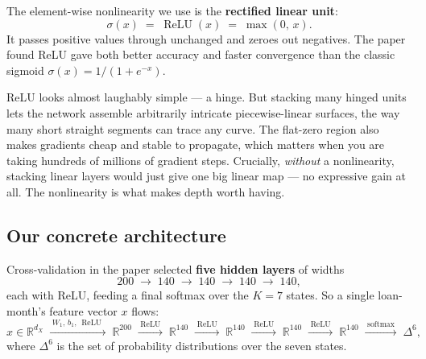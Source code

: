\documentclass[11pt]{article}
\newcommand{\R}{\mathbb{R}}
\newcommand{\softmax}{\operatorname{softmax}}
\newcommand{\relu}{\operatorname{ReLU}}
\begin{document}
The element-wise nonlinearity we use is the \textbf{rectified linear unit}:
\begin{equation}
  \sigma(x) \;=\; \relu(x) \;=\; \max(0,\, x).
  \label{eq:relu}
\end{equation}
It passes positive values through unchanged and zeroes out negatives. The paper found ReLU
gave both better accuracy and faster convergence than the classic sigmoid
$\sigma(x)=1/(1+e^{-x})$.

\begin{intuition}
ReLU looks almost laughably simple --- a hinge. But stacking many hinged units lets the
network assemble arbitrarily intricate piecewise-linear surfaces, the way many short
straight segments can trace any curve. The flat-zero region also makes gradients cheap and
stable to propagate, which matters when you are taking hundreds of millions of gradient
steps. Crucially, \emph{without} a nonlinearity, stacking linear layers would just give one
big linear map --- no expressive gain at all. The nonlinearity is what makes depth worth
having.
\end{intuition}

\subsection{Our concrete architecture}

Cross-validation in the paper selected \textbf{five hidden layers} of widths
\[
  200 \;\to\; 140 \;\to\; 140 \;\to\; 140 \;\to\; 140,
\]
each with ReLU, feeding a final softmax over the $K=7$ states. So a single loan-month's
feature vector $x$ flows:
\[
  x \in \R^{d_X}
  \;\xrightarrow{\;W_1,\,b_1,\,\relu\;}\; \R^{200}
  \;\xrightarrow{\;\relu\;}\; \R^{140}
  \;\xrightarrow{\;\relu\;}\; \R^{140}
  \;\xrightarrow{\;\relu\;}\; \R^{140}
  \;\xrightarrow{\;\relu\;}\; \R^{140}
  \;\xrightarrow{\;\softmax\;}\; \Delta^{6},
\]
where $\Delta^6$ is the set of probability distributions over the seven states.
\end{document}
